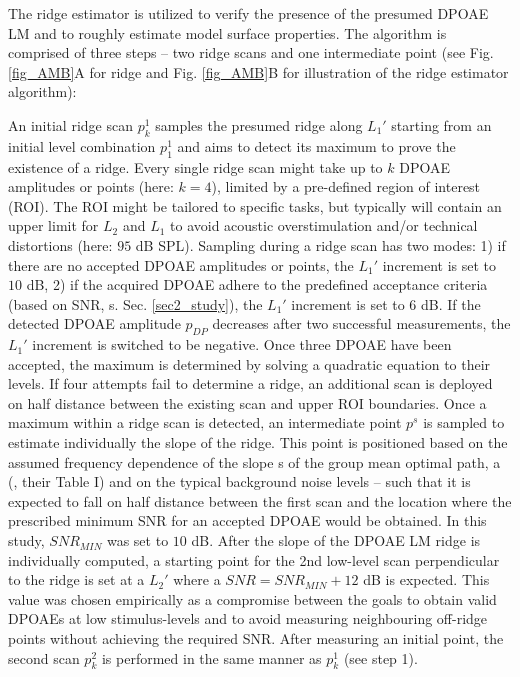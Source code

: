 \documentclass[journal,twoside,web]{ieeecolor2}
\begin{document}
The ridge estimator \cite{ED2017} is utilized to verify the presence of the presumed DPOAE LM and to roughly estimate model surface properties.
The algorithm is comprised of three steps – two ridge scans and one intermediate point (see Fig. \ref{fig_AMB}A for ridge and Fig. \ref{fig_AMB}B for illustration of the ridge estimator algorithm):
\begin{algorithmic}[1]
\STATE An initial ridge scan $p_k^1$ samples the presumed ridge along $L_1'$ starting from an initial level combination $p_1^1$ and aims to detect its maximum to prove the existence of a ridge.
Every single ridge scan might take up to $k$ DPOAE amplitudes or points (here: $k=4$), limited by a pre-defined region of interest (ROI).
The ROI might be tailored to specific tasks, but typically will contain an upper limit for $L_2$ and $L_1$ to avoid acoustic overstimulation and/or technical distortions (here: $95$ dB SPL).
Sampling during a ridge scan has two modes: 1) if there are no accepted DPOAE amplitudes or points, the $L_1'$ increment is set to $10$ dB, 2) if the acquired DPOAE adhere to the predefined acceptance criteria (based on SNR, s. Sec. \ref{sec2_study}), the $L_1'$ increment is set to $6$ dB.
If the detected DPOAE amplitude $p_{DP}$ decreases after two successful measurements, the $L_1'$ increment is switched to be negative.
Once three DPOAE have been accepted, the maximum is determined by solving a quadratic equation to their levels.
If four attempts fail to determine a ridge, an additional scan is deployed on half distance between the existing scan and upper ROI boundaries.
\STATE Once a maximum within a ridge scan is detected, an intermediate point $p^s$ is sampled to estimate individually the slope of the ridge.
This point is positioned based on the assumed frequency dependence of the slope s of the group mean optimal path, a (\cite{ZD2020}, their Table I) and on the typical background noise levels – such that it is expected to fall on half distance between the first scan and the location where the prescribed minimum SNR for an accepted DPOAE would be obtained.
In this study, $SNR_{MIN}$ was set to $10$ dB.
\STATE After the slope of the DPOAE LM ridge is individually computed, a starting point for the 2nd low-level scan perpendicular to the ridge is set at a $L_2'$ where a $SNR = SNR_{MIN} + 12$ dB is expected.
This value was chosen empirically as a compromise between the goals to obtain valid DPOAEs at low stimulus-levels and to avoid measuring neighbouring off-ridge points without achieving the required SNR.
After measuring an initial point, the second scan $p_k^2$ is performed in the same manner as $p_k^1$ (see step 1).
\end{algorithmic} 
\end{document}
